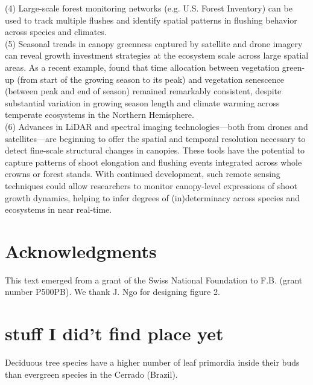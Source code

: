\documentclass{article}
\begin{document}
	(4) Large-scale forest monitoring networks (e.g. U.S. Forest Inventory) can be used to track multiple flushes and identify spatial patterns in flushing behavior across species and climates. \\%
	
	(5) Seasonal trends in canopy greenness captured by satellite and drone imagery can reveal growth investment strategies at the ecosystem scale across large spatial areas. As a recent example, \citet{mengConsistentTimeAllocation2024} found that time allocation between vegetation green-up (from start of the growing season to its peak) and vegetation senescence (between peak and end of season) remained remarkably consistent, despite substantial variation in growing season length and climate warming across temperate ecosystems in the Northern Hemisphere.  \\%

	(6) Advances in LiDAR and spectral imaging technologies—both from drones and satellites—are beginning to offer the spatial and temporal resolution necessary to detect fine-scale structural changes in canopies. These tools have the potential to capture patterns of shoot elongation and flushing events integrated across whole crowns or forest stands. With continued development, such remote sensing techniques could allow researchers to monitor canopy-level expressions of shoot growth dynamics, helping to infer degrees of (in)determinacy across species and ecosystems in near real-time.  
	

	
\section*{Acknowledgments}
	This text emerged from a grant of the Swiss National Foundation to F.B. (grant number P500PB). We thank J. Ngo for designing figure 2.
	
	
	\pagebreak
	

	\newpage
\section*{stuff I did't find place yet}

Deciduous tree species have a higher number of leaf primordia inside their buds than evergreen species in the Cerrado (Brazil). 
	
\end{document}
